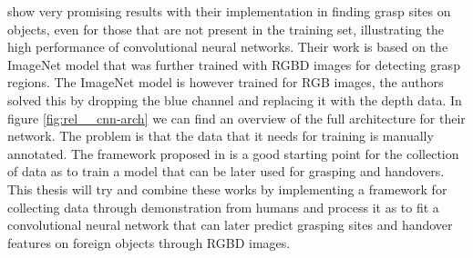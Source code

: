 \textcite{Redmon2014} show very promising results with their implementation in finding grasp sites on objects, even for those that are not present in the training set, illustrating the high performance of convolutional neural networks. Their work is based on the ImageNet model that was further trained with RGBD images for detecting grasp regions. The ImageNet model is however trained for RGB images, the authors solved this by dropping the blue channel and replacing it with the depth data. In figure \ref{fig:rel__cnn-arch} we can find an overview of the full architecture for their network. The problem is that the data that it needs for training is manually annotated. The framework proposed in \parencite{Chan2015a} is a good starting point for the collection of data as to train a model that can be later used for grasping and handovers. This thesis will try and combine these works by implementing a framework for collecting data through demonstration from humans and process it as to fit a convolutional neural network that can later predict grasping sites and handover features on foreign objects through RGBD images.
